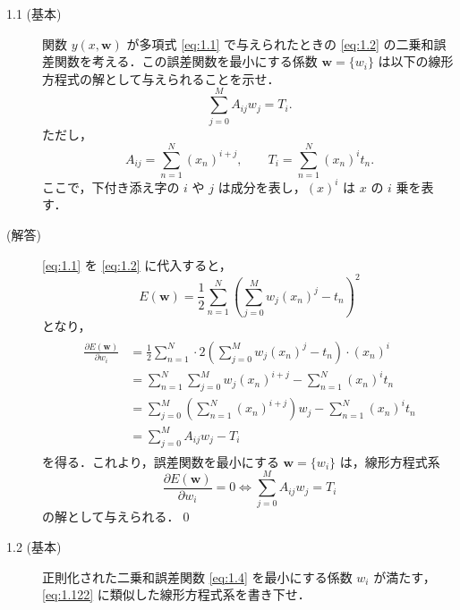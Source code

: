 \documentclass[uplatex,a4paper,oneside,openany,dvipdfmx]{jsarticle}
\numberwithin{equation}{section}
\theoremstyle{mystyle} %
\newcommand{\bs}[1]{\boldsymbol{#1}}
\begin{document}
\begin{description}

\item[1.1 (基本)]  関数 $y(x, \bs{w})$ が多項式 \eqref{eq:1.1} で与えられたときの \eqref{eq:1.2} の二乗和誤差関数を考える．この誤差関数を最小にする係数 $\bs{w} = \{w_{i}\}$ は以下の線形方程式の解として与えられることを示せ．
\begin{equation} \label{eq:1.122}
    \sum_{j=0}^{M} A_{ij} w_{j} = T_{i}.
\end{equation}
ただし，
\begin{equation}
    A_{ij} = \sum_{n=1}^{N} (x_{n})^{i+j}, \qquad T_{i} = \sum_{n=1}^{N} (x_{n})^{i} t_{n}.
\end{equation}
ここで，下付き添え字の $i$ や $j$ は成分を表し，$(x)^{i}$ は $x$ の $i$ 乗を表す．

\item[(解答)] \eqref{eq:1.1} を \eqref{eq:1.2} に代入すると，
\begin{equation}
    E(\bs{w}) = \frac{1}{2} \sum_{n=1}^{N} \left(\sum_{j=0}^{M} w_{j}(x_{n})^{j} - t_{n}\right)^{2}
\end{equation}
となり，
\begin{align}
    \begin{aligned}
        \frac{\partial E(\bs{w})}{\partial w_{i}} &= \frac{1}{2} \sum_{n=1}^{N} \cdot 2 \left(\sum_{j=0}^{M} w_{j}(x_{n})^{j} - t_{n}\right) \cdot (x_{n})^{i} \\
        &= \sum_{n=1}^{N} \sum_{j=0}^{M} w_{j}(x_{n})^{i+j} - \sum_{n=1}^{N} (x_{n})^{i}t_{n} \\
        &= \sum_{j=0}^{M} \left(\sum_{n=1}^{N} (x_{n})^{i+j}\right) w_{j} - \sum_{n=1}^{N} (x_{n})^{i}t_{n} \\
        &= \sum_{j=0}^{M} A_{ij}w_{j} - T_{i}
    \end{aligned}
\end{align}
を得る．これより，誤差関数を最小にする $\bs{w} = \{w_{i}\}$ は，線形方程式系
\begin{equation}
    \frac{\partial{E(\bs{w})}}{\partial{w_{i}}} = 0 \iff \sum_{j=0}^{M} A_{ij}w_{j} = T_{i}
\end{equation}
の解として与えられる．\qed

\item[1.2 (基本)] 正則化された二乗和誤差関数 \eqref{eq:1.4} を最小にする係数 $w_{i}$ が満たす，\eqref{eq:1.122} に類似した線形方程式系を書き下せ．


\end{description}
\end{document}
